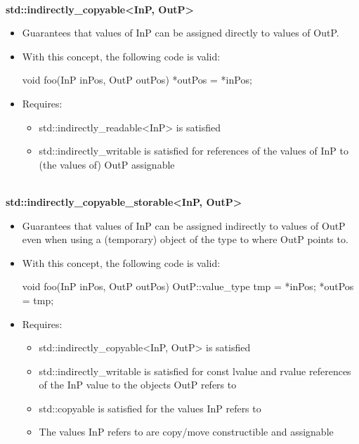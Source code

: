 \noindent
\hspace*{\fill} \\ %
\textbf{std::indirectly\_copyable<InP, OutP>}

\begin{itemize}
\item
Guarantees that values of InP can be assigned directly to values of OutP.

\item
With this concept, the following code is valid:

\begin{cpp}
void foo(InP inPos, OutP outPos) {
	*outPos = *inPos;
}
\end{cpp}

\item
Requires:
\begin{itemize}
\item
std::indirectly\_readable<InP> is satisfied

\item
std::indirectly\_writable is satisfied for references of the values of InP to (the values of) OutP assignable
\end{itemize}
\end{itemize}

\noindent
\hspace*{\fill} \\ %
\textbf{std::indirectly\_copyable\_storable<InP, OutP>}

\begin{itemize}
\item
Guarantees that values of InP can be assigned indirectly to values of OutP even when using a (temporary) object of the type to where OutP points to.

\item
With this concept, the following code is valid:

\begin{cpp}
void foo(InP inPos, OutP outPos) {
	OutP::value_type tmp = *inPos;
	*outPos = tmp;
}
\end{cpp}

\item
Requires:
\begin{itemize}
\item
std::indirectly\_copyable<InP, OutP> is satisfied

\item
std::indirectly\_writable is satisfied for const lvalue and rvalue references of the InP value to the objects OutP refers to

\item
std::copyable is satisfied for the values InP refers to

\item
The values InP refers to are copy/move constructible and assignable
\end{itemize}
\end{itemize}


